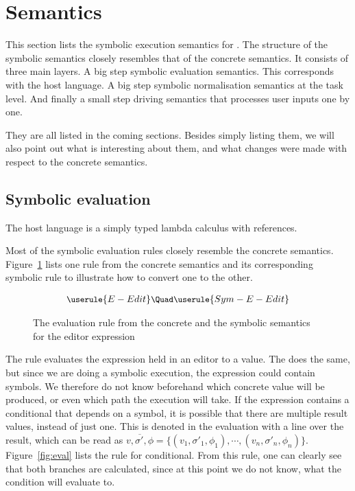 

\section{Semantics}
\label{sec:semantics}

This section lists the symbolic execution semantics for \TOPHAT.
The structure of the symbolic semantics closely resembles that of the concrete semantics.
It consists of three main layers.
A big step symbolic evaluation semantics.
This corresponds with the host language.
A big step symbolic normalisation semantics at the task level.
And finally a small step driving semantics that processes user inputs one by one.

They are all listed in the coming sections.
Besides simply listing them, we will also point out what is interesting about them,
and what changes were made with respect to the concrete semantics.

\subsection{Symbolic evaluation}

The host language is a simply typed lambda calculus with references.

Most of the symbolic evaluation rules closely resemble the concrete semantics.
Figure~\ref{fig:oldToNewSemantics} lists one rule from the concrete semantics and its corresponding symbolic rule to illustrate how to convert one to the other.

\begin{figure}[h]

  \begin{gather*}
    \small
    \userule{E-Edit}\Quad
    \userule{Sym-E-Edit}
  \end{gather*}

  \caption{The evaluation rule from the concrete and the symbolic semantics for the editor expression}
  \label{fig:oldToNewSemantics}
\end{figure}

The  rule evaluates the expression held in an editor to a value.
The  does the same, but since we are doing a symbolic execution, the expression could contain symbols.
We therefore do not know beforehand which concrete value will be produced, or even which path the execution will take.
If the expression contains a conditional that depends on a symbol, it is possible that there are multiple result values, instead of just one.
This is denoted in the evaluation with a line over the result, which can be read as $\overline{v,\sigma',\phi} = \{(v_1,\sigma'_1,\phi_1),\cdots,(v_n,\sigma'_n,\phi_n)\}$.
Figure~\ref{fig:eval} lists the rule for conditional.
From this rule, one can clearly see that both branches are calculated, since at this point we do not know, what the condition will evaluate to.

